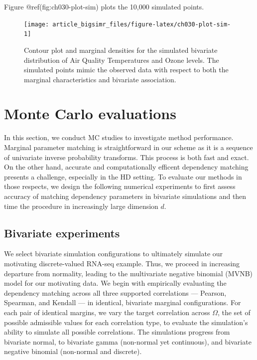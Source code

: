 \documentclass[
]{jss}
\begin{document}
Figure @ref(fig:ch030-plot-sim) plots the 10,000 simulated points.

\begin{CodeChunk}
\begin{figure}

{\centering \texttt{[image: article\_bigsimr\_files/figure-latex/ch030-plot-sim-1]} 

}

\caption[Contour plot and marginal densities for the simulated bivariate distribution of Air Quality Temperatures and Ozone levels]{Contour plot and marginal densities for the simulated bivariate distribution of Air Quality Temperatures and Ozone levels. The simulated points mimic the observed data with respect to both the marginal characteristics and bivariate association.}\label{fig:ch030-plot-sim}
\end{figure}
\end{CodeChunk}

\hypertarget{simulations}{%
\section{Monte Carlo evaluations}\label{simulations}}

In this section, we conduct MC studies to investigate method
performance. Marginal parameter matching is straightforward in our
scheme as it is a sequence of univariate inverse probability transforms.
This process is both fast and exact. On the other hand, accurate and
computationally efficent dependency matching presents a challenge,
especially in the HD setting. To evaluate our methods in those respects,
we design the following numerical experiments to first assess accuracy
of matching dependency parameters in bivariate simulations and then time
the procedure in increasingly large dimension \(d\).

\hypertarget{bivariate-experiments}{%
\subsection{Bivariate experiments}\label{bivariate-experiments}}

We select bivariate simulation configurations to ultimately simulate our
motivating discrete-valued RNA-seq example. Thus, we proceed in
increasing departure from normality, leading to the multivariate
negative binomial (MVNB) model for our motivating data. We begin with
empirically evaluating the dependency matching across all three
supported correlations --- Pearson, Spearman, and Kendall --- in
identical, bivariate marginal configurations. For each pair of identical
margins, we vary the target correlation across \(\Omega\), the set of
possible admissible values for each correlation type, to evaluate the
simulation's ability to simulate all possible correlations. The
simulations progress from bivariate normal, to bivariate gamma
(non-normal yet continuous), and bivariate negative binomial (non-normal
and discrete).
\end{document}
